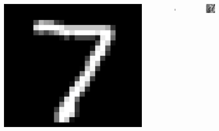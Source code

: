 \documentclass[aspectratio=169,usenames,dvipsnames]{beamer}
\begin{document}
\begin{frame}
\begin{columns}[c]
\begin{column}{.25\linewidth}
\begin{figure}
\centering
\includegraphics[width=0.8\linewidth]{mnist_digit_sample.png}
\end{figure}
\end{column}

\begin{column}{0.03\linewidth}
\Huge
$\Rightarrow$
\normalsize
\end{column}

\begin{column}{.25\linewidth}
\begin{figure}
\centering
\includegraphics[width=0.8\linewidth]{lena.jpg}
\end{figure}
\end{column}

\end{columns}


\end{frame}
\end{document}
